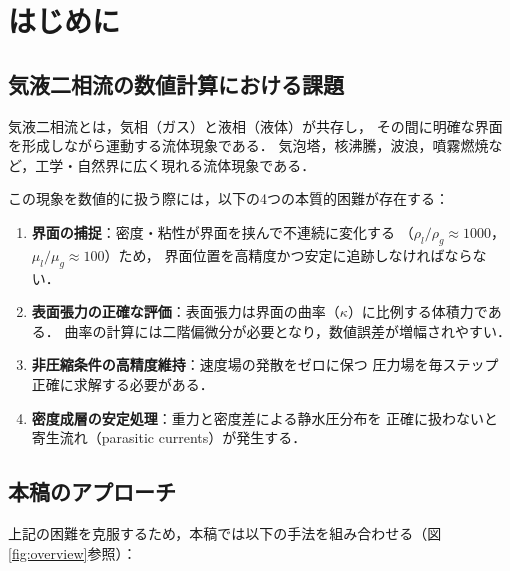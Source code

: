 \documentclass[12pt, a4paper, titlepage]{article}
\newcommand{\jp}[1]{{\normalfont\jpfont #1}}
\begin{document}
\tableofcontents
\newpage

\section{\jp{はじめに}}
\label{sec:intro}

\subsection{\jp{気液二相流の数値計算における課題}}

\jp{気液二相流とは，気相（ガス）と液相（液体）が共存し，
その間に明確な界面を形成しながら運動する流体現象である．
気泡塔，核沸騰，波浪，噴霧燃焼など，工学・自然界に広く現れる流体現象である．}

\jp{この現象を数値的に扱う際には，以下の4つの本質的困難が存在する：}

\begin{enumerate}
  \item \jp{\textbf{界面の捕捉}：密度・粘性が界面を挟んで不連続に変化する
        （$\rho_l/\rho_g \approx 1000$，$\mu_l/\mu_g \approx 100$）ため，
        界面位置を高精度かつ安定に追跡しなければならない．}
  \item \jp{\textbf{表面張力の正確な評価}：表面張力は界面の曲率（$\kappa$）に比例する体積力である．
        曲率の計算には二階偏微分が必要となり，数値誤差が増幅されやすい．}
  \item \jp{\textbf{非圧縮条件の高精度維持}：速度場の発散をゼロに保つ
        圧力場を毎ステップ正確に求解する必要がある．}
  \item \jp{\textbf{密度成層の安定処理}：重力と密度差による静水圧分布を
        正確に扱わないと寄生流れ（parasitic currents）が発生する．}
\end{enumerate}

\subsection{\jp{本稿のアプローチ}}

\jp{上記の困難を克服するため，本稿では以下の手法を組み合わせる（図\ref{fig:overview}参照）：}
\end{document}
